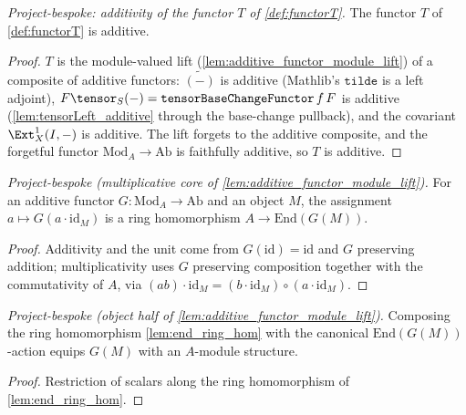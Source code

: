 \begin{lemma}

\leanok
[$T$ is additive]
  \label{lem:functorT_additive}
  \textit{Project-bespoke: additivity of the functor $T$ of \cref{def:functorT}.}
  The functor $T$ of \cref{def:functorT} is additive.
  \begin{proof}
    $T$ is the module-valued lift (\cref{lem:additive_functor_module_lift}) of a
    composite of additive functors: $\widetilde{(-)}$ is additive (Mathlib's
    $\mathtt{tilde}$ is a left adjoint), $F\tensor_S(-) =
    \mathtt{tensorBaseChangeFunctor}\,f\,F$ is additive (\cref{lem:tensorLeft_additive}
    through the base-change pullback), and the covariant $\Ext^1_X(I,-)$ is additive.
    The lift forgets to the additive composite, and the forgetful functor
    $\mathrm{Mod}_A \to \mathrm{Ab}$ is faithfully additive, so $T$ is additive.
  \end{proof}
\end{lemma}

\begin{lemma}
  \label{lem:end_ring_hom}
  \textit{Project-bespoke (multiplicative core of \cref{lem:additive_functor_module_lift}).}
  For an additive functor $G : \mathrm{Mod}_A \to \mathrm{Ab}$ and an object $M$,
  the assignment $a \mapsto G(a\cdot\mathrm{id}_M)$ is a ring homomorphism
  $A \to \mathrm{End}(G(M))$.
  \begin{proof}
    Additivity and the unit come from $G(\mathrm{id}) = \mathrm{id}$ and
    $G$ preserving addition; multiplicativity uses $G$ preserving composition
    together with the commutativity of $A$, via
    $(ab)\cdot\mathrm{id}_M = (b\cdot\mathrm{id}_M)\circ(a\cdot\mathrm{id}_M)$.
  \end{proof}
\end{lemma}

\begin{lemma}
  \label{lem:module_of_lift}
  \textit{Project-bespoke (object half of \cref{lem:additive_functor_module_lift}).}
  Composing the ring homomorphism \cref{lem:end_ring_hom} with the canonical
  $\mathrm{End}(G(M))$-action equips $G(M)$ with an $A$-module structure.
  \begin{proof}
    Restriction of scalars along the ring homomorphism of \cref{lem:end_ring_hom}.
  \end{proof}
\end{lemma}

